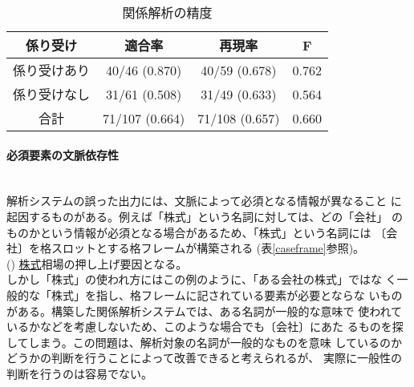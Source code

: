 \documentclass{nlp}
\begin{document}
  \begin{table}[t]
   \small{
   \caption{関係解析の精度}
   \label{result}
   \begin{center}
    \begin{tabular}{c|c|c|c} \hline
     係り受け & 適合率 & 再現率 & F\\\hline
     係り受けあり & 40/46 (0.870) & 40/59 (0.678) & 0.762\\ 
     係り受けなし & 31/61 (0.508) & 31/49 (0.633) & 0.564\\\hline
     合計 & 71/107 (0.664) & 71/108 (0.657) & 0.660\\\hline 
    \end{tabular}
   \end{center}
   }
  \end{table}

    \paragraph{必須要素の文脈依存性}\ \\
    解析システムの誤った出力には、文脈によって必須となる情報が異なること
    に起因するものがある。例えば「株式」という名詞に対しては、どの「会社」
    のものかという情報が必須となる場合があるため、「株式」という名詞には
    〔会社〕を格スロットとする格フレームが構築される
    (表\ref{caseframe}参照)。
    \vspace{1.5ex}\\
    \hspace{1em}(\theexample)
    \underline{株式}相場の押し上げ要因となる。\vspace{1.5ex}\\
    しかし「株式」の使われ方にはこの例のように、「ある会社の株式」ではな
    く一般的な「株式」を指し、格フレームに記されている要素が必要とならな
    いものがある。構築した関係解析システムでは、ある名詞が一般的な意味で
    使われているかなどを考慮しないため、このような場合でも〔会社〕にあた
    るものを探してしまう。この問題は、解析対象の名詞が一般的なものを意味
    しているのかどうかの判断を行うことによって改善できると考えられるが、
    実際に一般性の判断を行うのは容易でない。
    
\end{document}
